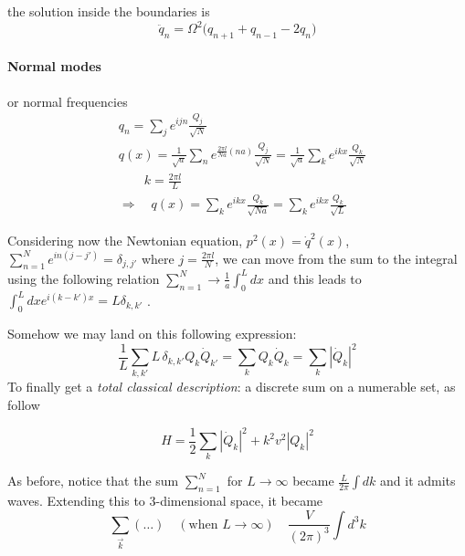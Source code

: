 \documentclass[class=article]{standalone}
\begin{document}
the solution inside the boundaries is
\begin{equation*}
\ddot q_n = \Omega^2 \Big( q_{n+1} + q_{n-1} -2 q_n \Big)
\end{equation*}


\paragraph{Normal modes} or normal frequencies
\begin{equation*}
\begin{split}
& q_n = \sum_j e^{i j n} \frac{Q_j}{\sqrt{N}} \\
& q(x) =  \frac{1}{\sqrt{a} } \sum_n e^{ \frac{2 \pi l}{N a} (n a) } \frac{Q_j}{\sqrt{N}}  = \frac{1}{\sqrt{a} }  \sum_k e^{i k x} \frac{Q_k}{\sqrt{N}} \\
& \quad\quad k = \frac{2 \pi l}{L} \\
& \Rightarrow\quad q(x) =  \sum_k e^{i k x} \frac{Q_k}{\sqrt{N a}} =  \sum_k e^{i k x} \frac{Q_k}{\sqrt{L}}
\end{split}
\end{equation*}

Considering now the Newtonian equation, $p^2(x) = \dot q^2(x) $, 
$ \sum_{n=1}^N e^{i n (j-j')} = \delta_{j, j'}$ where $j = \frac{2\pi l}{N}$, 
we can move from the sum to the integral using the following relation 
$ \sum_{n=1}^N \to \frac{1}{a} \int_{0}^{L} dx$ and this leads to
$\int_{0}^{L} dx e^{i (k-k') x} = L \delta_{k, k'}$ .

Somehow we may land on this following expression:
\begin{equation*}
\frac{1}{L} \sum_{k, k'} L \, \delta_{k, k'} Q_k \dot Q_{k'} = \sum_k Q_k \dot Q_{k} =   \sum_k | \dot Q_{k} |^2
\end{equation*}
To finally get a \emph{total classical description}: a discrete sum on a numerable set, as follow

\begin{equation*}
H = \frac{1}{2}  \sum_k  | \dot Q_{k} |^2 + k^2 v^2  | Q_{k} |^2
\end{equation*}

As before, notice that the sum $ \sum_{n=1}^N $ for $L \to \infty$ became $\frac{L}{2 \pi} \int dk$ and it admits waves.
Extending this to 3-dimensional space, it became
\begin{equation*}
 \sum_{\vec k} (\ldots) \quad (\mbox{when }L \to \infty) \quad \frac{V}{(2\pi)^3} \int d^3 k 
\end{equation*}
\end{document}
